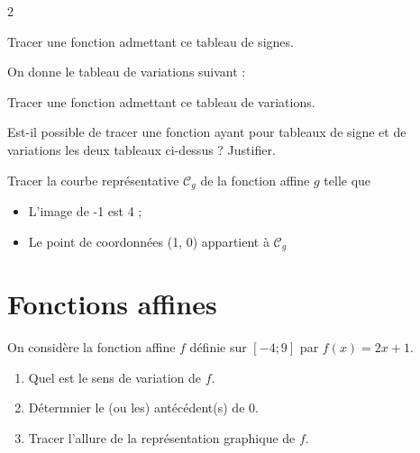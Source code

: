 \documentclass[10pt,a4paper]{article}
\begin{document}
\begin{multicols}{2}
\begin{exo}[][appro]
Tracer une fonction admettant ce tableau de signes.
\end{exo}

\begin{exo}[][appro]
On donne le tableau de variations suivant :

\begin{center}
\end{center}

Tracer une fonction admettant ce tableau de variations.
\end{exo}

\begin{exo}[][avance]
    Est-il possible de tracer une fonction ayant pour tableaux de signe et de variations les deux tableaux ci-dessus ? Justifier.
\end{exo}


\begin{exo}[][appro]
    Tracer la courbe représentative \(\mathcal{C}_g\) de la fonction affine \(g\) telle que \begin{itemize}
        \item L'image de -1 est 4 ;
        \item Le point de coordonnées (1, 0) appartient à \(\mathcal{C}_g\)
    \end{itemize}
\end{exo}


    \section{Fonctions affines}

\begin{exo}[Rappels][]
On considère la fonction affine \(f\) définie sur \(\left[-4;9\right]\) par \(f(x)=2x+1\).

\begin{enumerate}[leftmargin=*]
    \item Quel est le sens de variation de \(f\).
    \item Détermnier le (ou les) antécédent(s) de \(0\).
    \item Tracer l'allure de la représentation graphique de \(f\).
    

\end{enumerate}
\end{exo}
\end{multicols}
\end{document}
